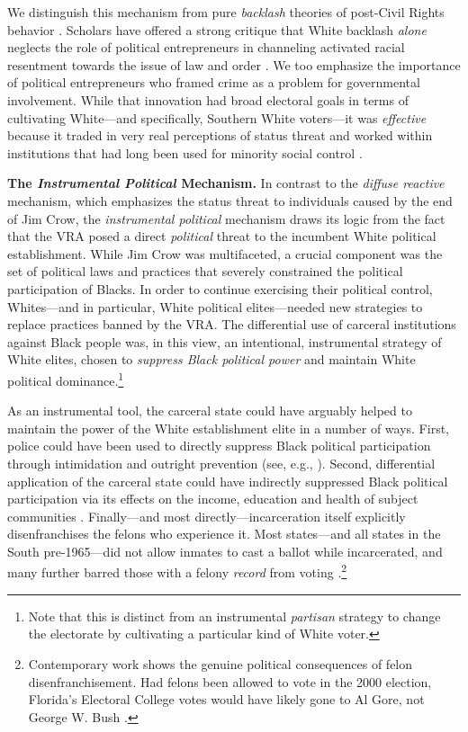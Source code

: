\documentclass[12pt]{article}
\begin{document}
We distinguish this mechanism from pure \emph{backlash} theories of post-Civil Rights behavior \citep{Edsall:1991ut}.  Scholars have offered a strong critique that White backlash \emph{alone} neglects the role of political entrepreneurs in channeling activated racial resentment towards the issue of law and order \citep{Weaver:2007vr,Lopez:2015vp}.  We too emphasize the importance of political entrepreneurs who framed crime as a problem for governmental involvement.  While that innovation had broad electoral goals in terms of cultivating White---and specifically, Southern White voters---it was \emph{effective} because it traded in very real perceptions of status threat and worked within institutions that had long been used for minority social control \citep{Muhammad:2011wf}.



\vspace{.12in}
\textbf{The \emph{Instrumental Political} Mechanism.} \text{  } In contrast to the \emph{diffuse reactive} mechanism, which emphasizes the status threat to individuals caused by the end of Jim Crow, the \emph{instrumental political} mechanism draws its logic from the fact that the VRA posed a direct \emph{political} threat to the incumbent White political establishment.  While Jim Crow was multifaceted, a crucial component was the set of political laws and practices that severely constrained the political participation of Blacks. In order to continue exercising their political control, Whites---and in particular, White political elites---needed new strategies to replace practices banned by the VRA.  The differential use of carceral institutions against Black people was, in this view, an intentional, instrumental strategy of White elites, chosen to \emph{suppress Black political power} and maintain White political dominance.\footnote{Note that this is distinct from an instrumental \emph{partisan} strategy to change the electorate by cultivating a particular kind of White voter.}

As an instrumental tool, the carceral state could have arguably helped to maintain the power of the White establishment elite in a number of ways.  First, police could have been used to directly suppress Black political participation through intimidation and outright prevention (see, e.g., \cite{CivilRightsCommission:1975vd}).  Second, differential application of the carceral state could have indirectly suppressed Black political participation via its effects on the income, education and health of subject communities \citep{Western:2007ut,Burch:2014ug}.  Finally---and most directly---incarceration itself explicitly disenfranchises the felons who experience it.  Most states---and all states in the South pre-1965---did not allow inmates to cast a ballot while incarcerated, and many further barred those with a felony \emph{record} from voting \citep{Manza:2008vp}.\footnote{Contemporary work shows the genuine political consequences of felon disenfranchisement.  Had felons been allowed to vote in the 2000 election, Florida's Electoral College votes would have likely gone to Al Gore, not George W. Bush \cite{Uggen:2002th}.}
\end{document}
